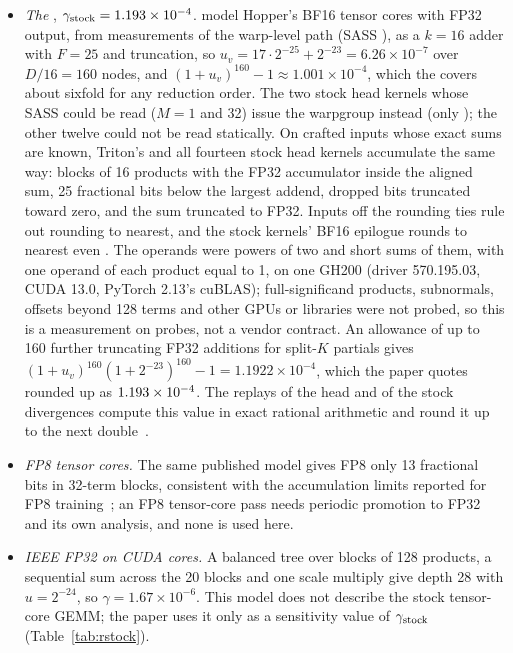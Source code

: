 \begin{itemize}
\item \emph{The \modelhopper{}}, $\gamma_{\rm stock}=1.193\times10^{-4}$. \citet{khattak2026} model Hopper's BF16 tensor cores with FP32 output, from measurements of the warp-level  path (SASS ), as a $k=16$ adder with $F=25$ and truncation, so $u_v=17\cdot2^{-25}+2^{-23}=6.26\times10^{-7}$ over $D/16=160$ nodes, and $(1+u_v)^{160}-1\approx1.001\times10^{-4}$, which the \modelcons{} covers about sixfold for any reduction order. The two stock head kernels whose SASS could be read ($M=1$ and 32) issue the warpgroup  instead (only ); the other twelve could not be read statically. On crafted inputs whose exact sums are known, Triton's  and all fourteen stock head kernels accumulate the same way: blocks of 16 products with the FP32 accumulator inside the aligned sum, 25 fractional bits below the largest addend, dropped bits truncated toward zero, and the sum truncated to FP32. Inputs off the rounding ties rule out rounding to nearest, and the stock kernels' BF16 epilogue rounds to nearest even . The operands were powers of two and short sums of them, with one operand of each product equal to 1, on one GH200 (driver 570.195.03, CUDA 13.0, PyTorch 2.13's cuBLAS); full-significand products, subnormals, offsets beyond 128 terms and other GPUs or libraries were not probed, so this is a measurement on probes, not a vendor contract. An allowance of up to 160 further truncating FP32 additions for split-$K$ partials gives $(1+u_v)^{160}(1+2^{-23})^{160}-1=1.1922\times10^{-4}$, which the paper quotes rounded up as $1.193\times10^{-4}$. The replays of the head and of the stock divergences compute this value in exact rational arithmetic and round it up to the next double~.
\item \emph{FP8 tensor cores.} The same published model gives FP8  only 13 fractional bits in 32-term blocks, consistent with the accumulation limits reported for FP8 training~\cite{deepseekv3}; an FP8 tensor-core pass needs periodic promotion to FP32 and its own analysis, and none is used here.
\item \emph{IEEE FP32 on CUDA cores.} A balanced tree over blocks of 128 products, a sequential sum across the 20 blocks and one scale multiply give depth 28 with $u=2^{-24}$, so $\gamma=1.67\times10^{-6}$. This model does not describe the stock tensor-core GEMM; the paper uses it only as a sensitivity value of $\gamma_{\rm stock}$ (Table~\ref{tab:rstock}).
\end{itemize}
